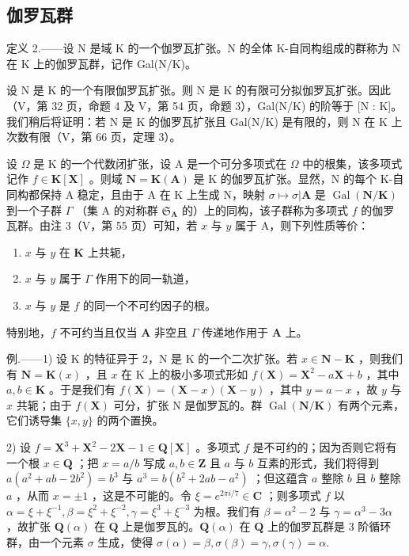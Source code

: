 \subsection{伽罗瓦群}

定义 2.——设 N 是域 K 的一个伽罗瓦扩张。N 的全体 K-自同构组成的群称为 N 在 K 上的伽罗瓦群，记作 Gal(N/K)。

设 N 是 K 的一个有限伽罗瓦扩张。则 N 是 K 的有限可分拟伽罗瓦扩张。因此（V，第 32 页，命题 4 及 V，第 54 页，命题 3），Gal(N/K) 的阶等于 {[}N : K{]}。我们稍后将证明：若 N 是 K 的伽罗瓦扩张且 Gal(N/K) 是有限的，则 N 在 K 上次数有限（V，第 66 页，定理 3）。

设 \(\Omega\) 是 K 的一个代数闭扩张，设 A 是一个可分多项式在 \(\Omega\) 中的根集，该多项式记作 \(f \in \mathbf{K}[\mathbf{X}]\) 。则域 \(\mathbf{N} = \mathbf{K}(\mathbf{A})\) 是 K 的伽罗瓦扩张。显然，N 的每个 K-自同构都保持 A 稳定，且由于 A 在 K 上生成 N，映射 \(\sigma \mapsto \sigma | \mathbf{A}\) 是 \(\operatorname{Gal}(\mathbf{N} / \mathbf{K})\) 到一个子群 \(\Gamma\) （集 A 的对称群 \(\mathfrak{S}_{\mathbf{A}}\) 的）上的同构，该子群称为多项式 \(f\) 的伽罗瓦群。由注 3（V，第 55 页）可知，若 \(x\) 与 \(y\) 属于 A，则下列性质等价：

\begin{enumerate}
\def\labelenumi{\alph{enumi})}
\item
  \(x\) 与 \(y\) 在 \(\mathbf{K}\) 上共轭，
\item
  \(x\) 与 \(y\) 属于 \(\Gamma\) 作用下的同一轨道，
\item
  \(x\) 与 \(y\) 是 \(f\) 的同一个不可约因子的根。
\end{enumerate}

特别地，\(f\) 不可约当且仅当 \(\mathbf{A}\) 非空且 \(\Gamma\) 传递地作用于 \(\mathbf{A}\) 上。

例.——1) 设 K 的特征异于 2，N 是 K 的一个二次扩张。若 \(x \in \mathbf{N} - \mathbf{K}\) ，则我们有 \(\mathbf{N} = \mathbf{K}(x)\) ，且 \(x\) 在 K 上的极小多项式形如 \(f(\mathbf{X}) = \mathbf{X}^2 - a\mathbf{X} + b\) ，其中 \(a, b \in \mathbf{K}\) 。于是我们有 \(f(\mathbf{X}) = (\mathbf{X} - x)(\mathbf{X} - y)\) ，其中 \(y = a - x\) ，故 \(y\) 与 \(x\) 共轭；由于 \(f(\mathbf{X})\) 可分，扩张 N 是伽罗瓦的。群 \(\operatorname{Gal}(\mathbf{N}/\mathbf{K})\) 有两个元素，它们诱导集 \(\{x, y\}\) 的两个置换。

2) 设 \(f = \mathbf{X}^3 + \mathbf{X}^2 - 2\mathbf{X} - 1 \in \mathbf{Q}[\mathbf{X}]\) 。多项式 \(f\) 是不可约的；因为否则它将有一个根 \(x \in \mathbf{Q}\) ；把 \(x = a / b\) 写成 \(a, b \in \mathbf{Z}\) 且 \(a\) 与 \(b\) 互素的形式，我们将得到 \(a(a^2 + ab - 2b^2) = b^3\) 与 \(a^3 = b(b^2 + 2ab - a^2)\) ；但这蕴含 \(a\) 整除 \(b\) 且 \(b\) 整除 \(a\) ，从而 \(x = \pm 1\) ，这是不可能的。令 \(\xi = e^{2\pi i / 7} \in \mathbf{C}\) ；则多项式 \(f\) 以 \(\alpha = \xi + \xi^{-1}, \beta = \xi^2 + \xi^{-2}, \gamma = \xi^3 + \xi^{-3}\) 为根。我们有 \(\beta = \alpha^2 - 2\) 与 \(\gamma = \alpha^3 - 3\alpha\) ，故扩张 \(\mathbf{Q}(\alpha)\) 在 \(\mathbf{Q}\) 上是伽罗瓦的。\(\mathbf{Q}(\alpha)\) 在 \(\mathbf{Q}\) 上的伽罗瓦群是 3 阶循环群，由一个元素 \(\sigma\) 生成，使得 \(\sigma(\alpha) = \beta, \sigma(\beta) = \gamma, \sigma(\gamma) = \alpha.\)

